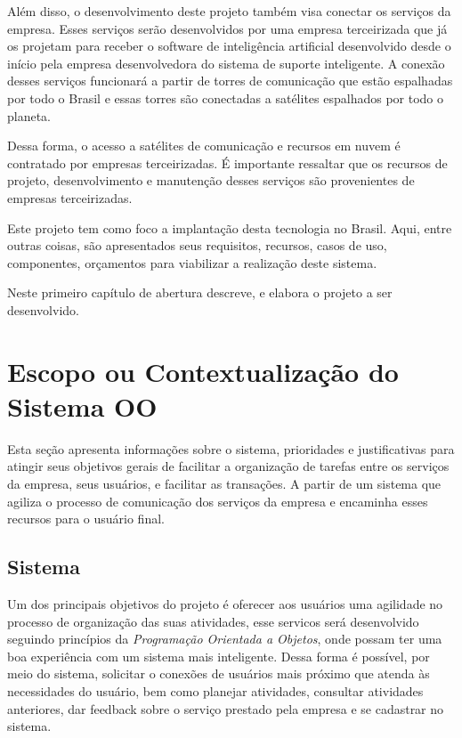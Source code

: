 Além disso, o desenvolvimento deste projeto também visa conectar os serviços da empresa. Esses serviços serão desenvolvidos por uma empresa terceirizada que já os projetam para receber o software de inteligência artificial desenvolvido desde o início pela empresa desenvolvedora do sistema de suporte inteligente. A conexão desses serviços funcionará a partir de torres de comunicação que estão espalhadas por todo o Brasil e essas torres são conectadas a satélites espalhados por todo o planeta.

Dessa forma, o acesso a satélites de comunicação e recursos em nuvem é contratado por empresas terceirizadas.
É importante ressaltar que os recursos de projeto, desenvolvimento e manutenção desses serviços são provenientes de empresas terceirizadas.

Este projeto tem como foco a implantação desta tecnologia no Brasil. Aqui, entre outras coisas, são apresentados seus requisitos, recursos, casos de uso, componentes, orçamentos para viabilizar a realização deste sistema.



Neste primeiro capítulo de abertura descreve, e elabora o projeto a ser desenvolvido.


\section{Escopo ou Contextualiza\c{c}\~{a}o do Sistema OO}
Esta seção apresenta informações sobre o sistema, prioridades e justificativas para atingir seus objetivos gerais de facilitar a organização de tarefas entre os serviços da empresa, seus usuários, e facilitar as transações. A partir de um sistema que agiliza o processo de comunicação dos serviços da empresa e encaminha esses recursos para o usuário final.
\subsection{Sistema}
Um dos principais objetivos do projeto é oferecer aos usuários uma agilidade no processo de organização das suas atividades, esse servicos será desenvolvido seguindo princípios da \textit{Programação Orientada a Objetos}, onde possam ter uma boa experiência com um sistema mais inteligente.
Dessa forma é possível, por meio do sistema, solicitar o conexões de usuários mais próximo que atenda às necessidades do usuário, bem como planejar atividades, consultar atividades anteriores, dar feedback sobre o serviço prestado pela empresa e se cadastrar no sistema.


